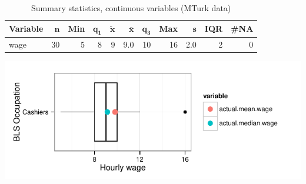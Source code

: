 \documentclass[a4paper,10pt]{article}\usepackage[]{graphicx}\usepackage[]{color}
\makeatletter
\def\maxwidth{ %
  \ifdim\Gin@nat@width>\linewidth
    \linewidth
  \else
    \Gin@nat@width
  \fi
}
\makeatother
\begin{document}
\begin{table}[ht]
\centering
{\footnotesize
\begin{tabular}{lrrrrrrrrrr}
 \textbf{Variable} & $\mathbf{n}$ & \textbf{Min} & $\mathbf{q_1}$ & $\mathbf{\widetilde{x}}$ & $\mathbf{\bar{x}}$ & $\mathbf{q_3}$ & \textbf{Max} & $\mathbf{s}$ & \textbf{IQR} & \textbf{\#NA} \\ 
  \hline
wage & 30 & 5 & 8 & 9 & 9.0 & 10 & 16 & 2.0 & 2 & 0 \\ 
  \end{tabular}
}
\caption{Summary statistics, continuous variables (MTurk data)} 
\label{tab2:41-2010}
\end{table}


{\centering \includegraphics[width=\maxwidth]{figure/unnamed-chunk-24} 

}
\end{document}

